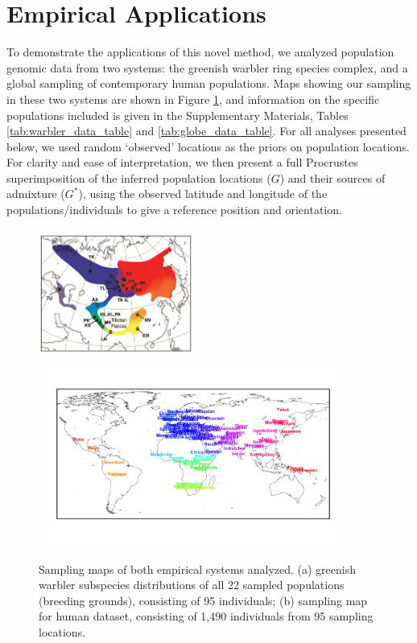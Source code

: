 \documentclass[12pt]{article}
\newcommand{\identifyadmixsource}[1]{{#1^{*}}}
\begin{document}
\section*{Empirical Applications}
To demonstrate the applications of this novel method, we analyzed population genomic data from two systems: the greenish warbler ring species complex, and a global sampling of contemporary human populations.  Maps showing our sampling in these two systems are shown in Figure \ref{sfig:empirical_maps}, and information on the specific populations included is given in the Supplementary Materials, Tables \ref{tab:warbler_data_table} and \ref{tab:globe_data_table}.  
For all analyses presented below, we used random `observed' locations as the priors on population locations.
For clarity and ease of interpretation, we then present a full Procrustes superimposition of the inferred population locations ($G$) and their sources of admixture ($\identifyadmixsource{G}$), using the observed latitude and longitude of the populations/individuals to give a reference position and orientation.

\begin{figure}
	\centering
			{\includegraphics[width=2in,height=1.66in]{figs/warblers/Irwin_warbler_map_figure.png}}
			{\includegraphics[width=4in,height=2.4in]{figs/globetrotter/globe_world_map_text.png}}
            \caption{Sampling maps of both empirical systems analyzed.  (a) greenish warbler subspecies distributions of all 22 sampled populations (breeding grounds), consisting of 95 individuals; (b) sampling map for human dataset, consisting of 1,490 individuals from 95 sampling locations.}
\label{sfig:empirical_maps}
\end{figure}
\end{document}
